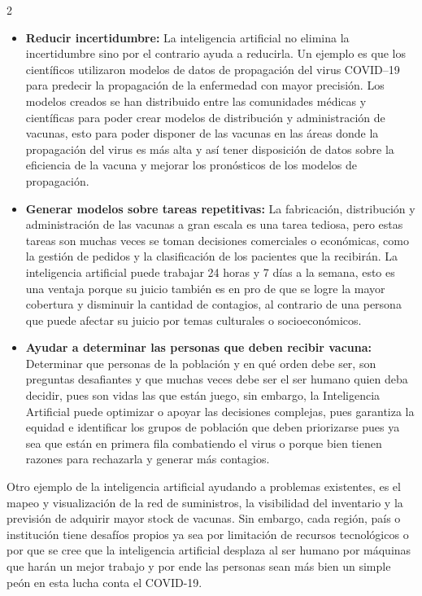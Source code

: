 \documentclass[12pt,spanish,Letterpaper,openany]{book}
\begin{document}
\begin {multicols}{2}
\begin{itemize}
\item
  \textbf{Reducir incertidumbre:} La inteligencia artificial no elimina la incertidumbre sino por
  el contrario ayuda a reducirla. Un ejemplo es que los científicos utilizaron modelos
  de datos de propagación del virus COVID--19 para predecir la propagación de la
  enfermedad con mayor precisión. Los modelos creados se han distribuido entre las
  comunidades médicas y científicas para poder crear modelos de distribución y
  administración de vacunas, esto para poder disponer de las vacunas en las áreas donde
  la propagación del virus es más alta y así tener disposición de datos sobre la eficiencia
  de la vacuna y mejorar los pronósticos de los modelos de propagación.
\item
  \textbf{Generar modelos sobre tareas repetitivas:} La fabricación, distribución y
  administración de las vacunas a gran escala es una tarea tediosa, pero estas tareas son
  muchas veces se toman decisiones comerciales o económicas, como la gestión de
  pedidos y la clasificación de los pacientes que la recibirán. La inteligencia artificial
  puede trabajar 24 horas y 7 días a la semana, esto es una ventaja porque su juicio
  también es en pro de que se logre la mayor cobertura y disminuir la cantidad de
  contagios, al contrario de una persona que puede afectar su juicio por temas culturales
  o socioeconómicos.
\item
  \textbf{Ayudar a determinar las personas que deben recibir vacuna:} Determinar que personas
  de la población y en qué orden debe ser, son preguntas desafiantes y que muchas
  veces debe ser el ser humano quien deba decidir, pues son vidas las que están juego,
  sin embargo, la Inteligencia Artificial puede optimizar o apoyar las decisiones
  complejas, pues garantiza la equidad e identificar los grupos de población que deben
  priorizarse pues ya sea que están en primera fila combatiendo el virus o porque bien
  tienen razones para rechazarla y generar más contagios.
\end{itemize}

Otro ejemplo de la inteligencia artificial ayudando a problemas existentes, es el mapeo y
visualización de la red de suministros, la visibilidad del inventario y la previsión de adquirir
mayor stock de vacunas. Sin embargo, cada región, país o institución tiene desafíos propios
ya sea por limitación de recursos tecnológicos o por que se cree que la inteligencia artificial
desplaza al ser humano por máquinas que harán un mejor trabajo y por ende las personas
sean más bien un simple peón en esta lucha conta el COVID-19.


\end{multicols}
\end{document}

